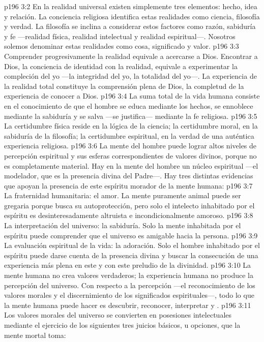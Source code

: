 \vs p196 3:2 En la realidad universal existen simplemente tres elementos: hecho, idea y relación. La conciencia religiosa identifica estas realidades como ciencia, filosofía y verdad. La filosofía se inclina a considerar estos factores como razón, sabiduría y fe ---realidad física, realidad intelectual y realidad espiritual---. Nosotros solemos denominar estas realidades como cosa, significado y valor.
\vs p196 3:3 Comprender progresivamente la realidad equivale a acercarse a Dios. Encontrar a Dios, la conciencia de identidad con la realidad, equivale a experimentar la compleción del yo ---la integridad del yo, la totalidad del yo---. La experiencia de la realidad total constituye la comprensión plena de Dios, la completud de la experiencia de conocer a Dios.
\vs p196 3:4 La suma total de la vida humana consiste en el conocimiento de que el hombre se educa mediante los hechos, se ennoblece mediante la sabiduría y se salva ---se justifica--- mediante la fe religiosa.
\vs p196 3:5 La certidumbre física reside en la lógica de la ciencia; la certidumbre moral, en la sabiduría de la filosofía; la certidumbre espiritual, en la verdad de una auténtica experiencia religiosa.
\vs p196 3:6 La mente del hombre puede lograr altos niveles de percepción espiritual y sus esferas correspondientes de valores divinos, porque no es completamente material. Hay en la mente del hombre un núcleo espiritual ---el modelador, que es la presencia divina del Padre---. Hay tres distintas evidencias que apoyan la presencia de este espíritu morador de la mente humana:
\vs p196 3:7 La fraternidad humanitaria: el amor. La mente puramente animal puede ser gregaria porque busca su autoprotección, pero solo el intelecto inhabitado por el espíritu es desinteresadamente altruista e incondicionalmente amoroso.
\vs p196 3:8 La interpretación del universo: la sabiduría. Solo la mente inhabitada por el espíritu puede comprender que el universo es amigable hacia la persona.
\vs p196 3:9 La evaluación espiritual de la vida: la adoración. Solo el hombre inhabitado por el espíritu puede darse cuenta de la presencia divina y buscar la consecución de una experiencia más plena en este y con este preludio de la divinidad.
\vs p196 3:10 \pc La mente humana no crea valores verdaderos; la experiencia humana no produce la percepción del universo. Con respecto a la percepción ---el reconocimiento de los valores morales y el discernimiento de los significados espirituales---, todo lo que la mente humana puede hacer es descubrir, reconocer, interpretar y .
\vs p196 3:11 Los valores morales del universo se convierten en posesiones intelectuales mediante el ejercicio de los siguientes tres juicios básicos, u opciones, que la mente mortal toma:
